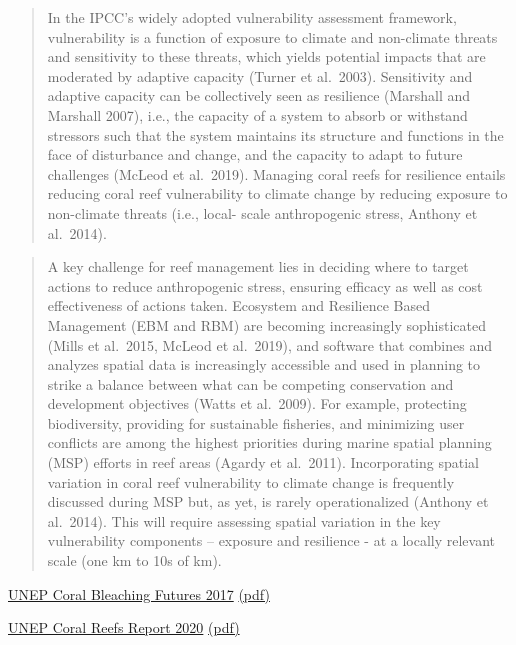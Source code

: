 \documentclass[
]{book}
\begin{document}
\begin{quote}
In the IPCC's widely adopted vulnerability assessment framework, vulnerability is a function of
exposure to climate and non-climate threats and sensitivity to these threats, which yields
potential impacts that are moderated by adaptive capacity (Turner et al.~2003). Sensitivity and
adaptive capacity can be collectively seen as resilience (Marshall and Marshall 2007), i.e., the
capacity of a system to absorb or withstand stressors such that the system maintains its
structure and functions in the face of disturbance and change, and the capacity to adapt to
future challenges (McLeod et al.~2019). Managing coral reefs for resilience entails reducing
coral reef vulnerability to climate change by reducing exposure to non-climate threats (i.e., local-
scale anthropogenic stress, Anthony et al.~2014).
\end{quote}

\begin{quote}
A key challenge for reef management lies in deciding where to target actions to reduce
anthropogenic stress, ensuring efficacy as well as cost effectiveness of actions taken.
Ecosystem and Resilience Based Management (EBM and RBM) are becoming increasingly
sophisticated (Mills et al.~2015, McLeod et al.~2019), and software that combines and analyzes
spatial data is increasingly accessible and used in planning to strike a balance between what
can be competing conservation and development objectives (Watts et al.~2009). For example,
protecting biodiversity, providing for sustainable fisheries, and minimizing user conflicts are
among the highest priorities during marine spatial planning (MSP) efforts in reef areas (Agardy
et al.~2011). Incorporating spatial variation in coral reef vulnerability to climate change is
frequently discussed during MSP but, as yet, is rarely operationalized (Anthony et al.~2014). This
will require assessing spatial variation in the key vulnerability components -- exposure and
resilience - at a locally relevant scale (one km to 10s of km).
\end{quote}

\href{https://www.unenvironment.org/resources/report/coral-bleaching-futures}{UNEP Coral Bleaching Futures 2017}
\href{/pdf/UNEP_2017_Coral_Bleaching_Futures.pdf}{(pdf)}

\href{https://www.unenvironment.org/resources/report/projections-future-coral-bleaching-conditions-using-ipcc-cmip6-models-climate}{UNEP Coral Reefs Report 2020}
\href{/pdf/UNEP_2020_Coral_Reefs_CMIP6.pdf}{(pdf)}
\end{document}
